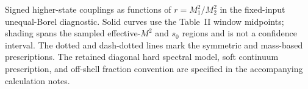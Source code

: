 \caption{Signed higher-state couplings as functions of $r=M_1^2/M_2^2$ in the fixed-input unequal-Borel diagnostic. Solid curves use the Table~II window midpoints; shading spans the sampled effective-$M^2$ and $s_0$ regions and is not a confidence interval. The dotted and dash-dotted lines mark the symmetric and mass-based prescriptions. The retained diagonal hard spectral model, soft continuum prescription, and off-shell fraction convention are specified in the accompanying calculation notes.}
